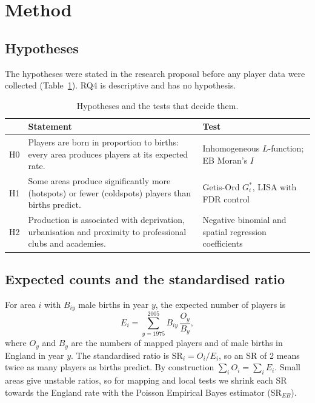 \section{Method}
\label{sec:method}

\subsection{Hypotheses}
The hypotheses were stated in the research proposal before any player data were collected (Table~\ref{tab:hyp}). RQ4 is descriptive and has no hypothesis.

\begin{table}[ht]
\centering
\caption{Hypotheses and the tests that decide them.}
\label{tab:hyp}
\small
\begin{tabular}{l>{\raggedright\arraybackslash}p{8.2cm}>{\raggedright\arraybackslash}p{4.6cm}}
\toprule
 & Statement & Test \\
\midrule
H0 & Players are born in proportion to births: every area produces players at its expected rate. & Inhomogeneous $L$-function; EB Moran's $I$ \\
H1 & Some areas produce significantly more (hotspots) or fewer (coldspots) players than births predict. & Getis-Ord $G_i^*$, LISA with FDR control \\
H2 & Production is associated with deprivation, urbanisation and proximity to professional clubs and academies. & Negative binomial and spatial regression coefficients \\
\bottomrule
\end{tabular}
\end{table}

\subsection{Expected counts and the standardised ratio}
For area $i$ with $B_{iy}$ male births in year $y$, the expected number of players is
\begin{equation}
E_i = \sum_{y=1975}^{2005} B_{iy}\, \frac{O_{y}}{B_{y}},
\end{equation}
where $O_y$ and $B_y$ are the numbers of mapped players and of male births in England in year $y$. The standardised ratio is $\mathrm{SR}_i = O_i/E_i$, so an SR of 2 means twice as many players as births predict. By construction $\sum_i O_i = \sum_i E_i$. Small areas give unstable ratios, so for mapping and local tests we shrink each SR towards the England rate with the Poisson Empirical Bayes estimator \cite{marshall1991} (SR$_{EB}$).

